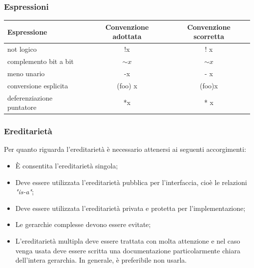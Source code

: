 \documentclass[../NomeDocumento.tex]{subfiles}
\begin{document}
	\subsubsection*{Espressioni}
	\begin{center}
	\begin{tabular}{|l|c|c|}
		\hline
		Espressione&Convenzione adottata&Convenzione scorretta \\ \hline
		not logico&!x&! x \\ \hline
		complemento bit a bit&${\sim}x$&$\sim x$ \\ \hline
		meno unario&-x&- x \\ \hline
		conversione esplicita&(foo) x&(foo)x \\ \hline
		deferenziazione puntatore&*x&* x \\ \hline
	\end{tabular}
	\end{center}
	
	\subsubsection*{Ereditarietà}
	Per quanto riguarda l'ereditarietà è necessario attenersi ai seguenti accorgimenti:
	\begin{itemize}
		\item È consentita l'ereditarietà singola;
		\item Deve essere utilizzata l'ereditarietà pubblica per l'interfaccia, cioè le relazioni \textit{"is-a"};
		\item Deve essere utilizzata l'ereditarietà privata e protetta per l'implementazione; 		
		\item Le gerarchie complesse devono essere evitate;
		\item L'ereditarietà multipla deve essere trattata con molta attenzione e nel caso venga usata deve essere scritta una documentazione particolarmente chiara dell'intera gerarchia. In generale, è preferibile non usarla.
	\end{itemize}
	
\end{document}
